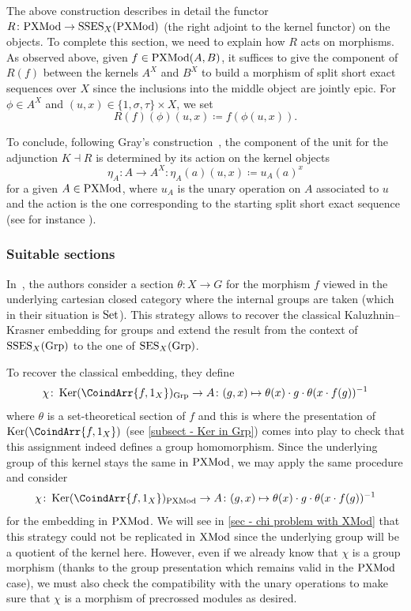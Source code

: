 \documentclass[a4paper, british, reqno]{amsart}
\newcommand*{\mapping}{\colon}
\DeclareMathOperator{\Ker}{Ker} %
\renewcommand*{\and}{,}
\renewcommand*{\and}{,}
\newcommand*{\CatName}[1]{\textnormal{#1}}
\newcommand*{\Grp}{\CatName{Grp}}
\newcommand*{\PXMod}{\CatName{PXMod}}
\newcommand*{\XMod}{\CatName{XMod}}
\newcommand*{\Set}{\CatName{Set}}
\newcommand*{\SSES}{\CatName{SSES}}
\newcommand*{\SES}{\CatName{SES}}
\theoremstyle{definition}
\theoremstyle{remark}
\begin{document}
The above construction describes in detail the functor \(R\colon \PXMod\to \SSES_X(\PXMod)\) (the right adjoint to the kernel functor) on the objects. To complete this section, we need to explain how \(R\) acts on morphisms. As observed above, given \(f\in \PXMod(A,B)\), it suffices to give the component of \(R(f)\) between the kernels \(A^X\) and \(B^X\) to build a morphism of split short exact sequences over \(X\) since the inclusions into the middle object are jointly epic. For \(\phi\in A^X\) and \((u,x)\in \{1,\sigma,\tau\}\times X\), we set
\begin{equation}
	\label{eq - R functor on morphisms}
	R(f)(\phi)(u,x)\coloneq f(\phi(u,x))\text{.}
\end{equation}

To conclude, following Gray's construction~\cite{Gra12}, the component of the unit for the adjunction \(K \dashv R\) is determined by its action on the kernel objects
\[
	\eta_A\colon A\to A^X\colon \eta_A(a)(u,x)\coloneq u_A(a)^x
\]
for a given \(A\in \PXMod\), where \(u_A\) is the unary operation on \(A\) associated to \(u\) and the action is the one corresponding to the starting split short exact sequence (see for instance \cite[Section~4]{BJK05}).

\subsubsection{Suitable sections}
\label{sec - suitable sections in PXMod}
In~\cite{DGMVdL}, the authors consider a section \(\theta\colon X\to G\) for the morphism \(f\) viewed in the underlying cartesian closed category where the internal groups are taken (which in their situation is \(\Set\)). This strategy allows to recover the classical Kaluzhnin--Krasner embedding for groups and extend the result from the context of \(\SSES_X(\Grp)\) to the one of \(\SES_X(\Grp)\).

To recover the classical embedding, they define
\[
	\chi\colon \Ker(\CoindArr{f\and 1_X})_{\Grp}\to A \mapping (g,x)\mapsto \theta(x)\cdot g\cdot  \theta(x\cdot f(g))^{-1}
\]
where \(\theta\) is a set-theoretical section of \(f\) and this is where the presentation of \(\Ker(\CoindArr{f\and 1_X})\) (see \cref{subsect - Ker in Grp}) comes into play to check that this assignment indeed defines a group homomorphism. Since the underlying group of this kernel stays the same in \(\PXMod\), we may apply the same procedure and consider
\[
	\chi\colon \Ker(\CoindArr{f\and 1_X})_{\PXMod}\to A \mapping (g,x)\mapsto \theta(x)\cdot g \cdot \theta(x\cdot f(g))^{-1}
\]
for the embedding in \(\PXMod\). We will see in \cref{sec - chi problem with XMod} that this strategy could not be replicated in \(\XMod\) since the underlying group will be a quotient of the kernel here. However, even if we already know that \(\chi\) is a group morphism (thanks to the group presentation which remains valid in the \(\PXMod\) case), we must also check the compatibility with the unary operations to make sure that \(\chi\) is a morphism of precrossed modules as desired.
\end{document}
